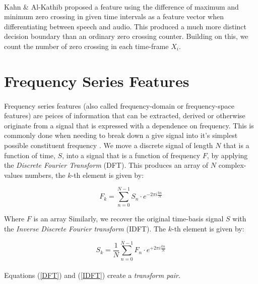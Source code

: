 \documentclass[12pt,letterpaper]{article}
\begin{document}
\paragraph*{}Kahn \& Al-Kathib \cite{Kahn 2006} proposed a feature using the difference of maximum and minimum zero crossing in given time intervals as a feature vector when differentiating between speech and audio. This produced a much more distinct decision boundary than an ordinary zero crossing counter. Building on this, we count the number of zero crossing in each time-frame $X_i$.



\section{Frequency Series Features}

\paragraph*{}Frequency series features (also called frequency-domain or frequency-space features) are peices of information that can be extracted, derived or otherwise originate from a signal that is expressed with a dependence on frequency. This is commonly done when needing to break down a give signal into it's simplest possible constituent frequency \cite{Peatross 2015}. We move a discrete signal of length $N$ that is a function of time, $S$, into a signal that is a function of frequency $F$, by applying the \textit{Discrete Fourier Transform} (DFT). This produces an array of $N$ complex-values numbers, the $k$-th element is given by:

\begin{equation}
\label{DFT}
F_{k} =  \sum_{n=0}^{N-1} S_{n} \cdot e^{-2\pi i\frac{kn}{N}}
\end{equation}

Where $F$ is an array Similarly, we recover the original time-basis signal $S$ with the \textit{Inverse Discrete Fourier transform} (IDFT). The $k$-th element is given by:

\begin{equation}
\label{IDFT}
S_{k} =  \frac{1}{N}\sum_{n=0}^{N-1} F_{n} \cdot e^{+2\pi i\frac{kn}{N}}
\end{equation}

\paragraph*{}Equations (\ref{DFT}) and (\ref{IDFT}) create a \textit{transform pair}.
\end{document}
